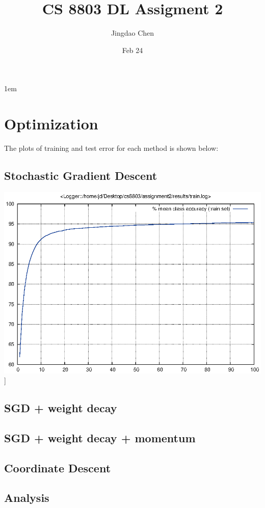 \documentclass[twoside,12pt]{article}
\newcommand{\imsize}{0.5\linewidth}
\begin{document}
\title{CS 8803 DL Assigment 2}
\author{Jingdao Chen}
\date{Feb 24}
\maketitle
\openup 1em

\section{Optimization}

The plots of training and test error for each method is shown below:

\subsection{Stochastic Gradient Descent}

\includegraphics[width=\imsize]{assignment2/results/sgd_train}]

\subsection{SGD + weight decay}
\subsection{SGD + weight decay + momentum}
\subsection{Coordinate Descent}
\subsection{Analysis}
\end{document}
